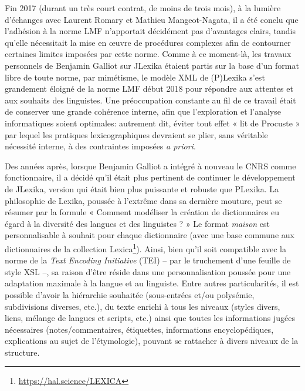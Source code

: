 Fin 2017 (durant un très court contrat, de moins de trois mois), à la lumière d'échanges avec Laurent Romary et Mathieu Mangeot-Nagata, il a été conclu que l'adhésion à la norme LMF n'apportait décidément pas d'avantages clairs, tandis qu'elle nécessitait la mise en œuvre de procédures complexes afin de contourner certaines limites imposées par cette norme. Comme à ce moment-là, les travaux personnels de Benjamin Galliot sur JLexika étaient partis sur la base d’un format libre de toute norme, par mimétisme, le modèle XML de (P)Lexika s’est grandement éloigné de la norme LMF début 2018 pour répondre aux attentes et aux souhaits
des linguistes. Une préoccupation constante au fil de ce travail était de conserver une grande cohérence interne, afin que l’exploration et l’analyse informatiques soient optimales: autrement dit, éviter tout effet « lit de Procuste » par lequel les pratiques lexicographiques devraient se plier, sans véritable nécessité interne, à des contraintes imposées \emph{a priori}.

Des années après, lorsque Benjamin Galliot a intégré à nouveau le CNRS comme fonctionnaire, il a décidé qu’il était plus pertinent de continuer le développement de JLexika, version qui était bien plus puissante et robuste que PLexika. La philosophie de Lexika, poussée à l’extrême dans sa dernière mouture, peut se résumer par la formule « Comment modéliser la création de dictionnaires eu égard à la diversité des langues et des linguistes ? » Le format \emph{maison} est personnalisable à souhait pour chaque dictionnaire (avec une base commune aux dictionnaires de la collection Lexica\footnote{\url{https://hal.science/LEXICA}}). Ainsi, bien qu’il soit compatible avec la norme de la \emph{Text Encoding Initiative} (TEI) – par le truchement d’une feuille de style XSL –, sa raison d’être réside dans une personnalisation poussée pour une adaptation maximale à la langue et au linguiste. Entre autres particularités, il est possible d’avoir la hiérarchie souhaitée (sous-entrées et/ou polysémie, subdivisions diverses, etc.), du texte enrichi à tous les niveaux (styles divers, liens, mélange de langues et scripts, etc.) ainsi que toutes les informations jugées nécessaires (notes/commentaires, étiquettes, informations encyclopédiques, explications au sujet de l'étymologie), pouvant se rattacher à divers niveaux de la structure.

